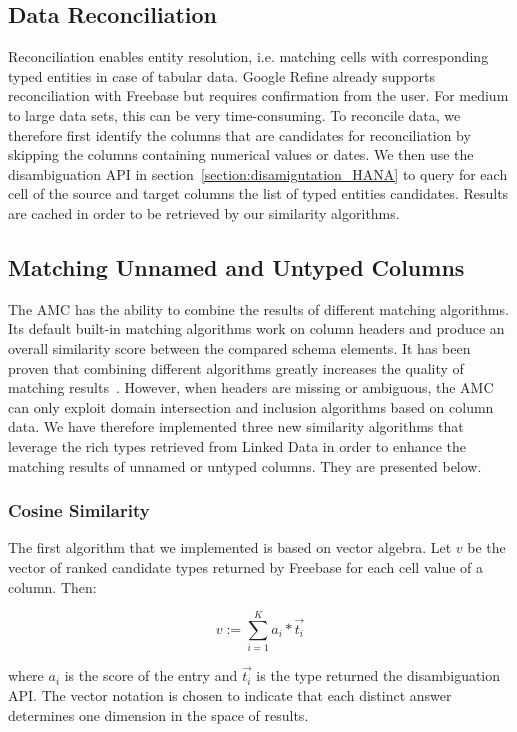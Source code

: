 \subsection{Data Reconciliation}
Reconciliation enables entity resolution, i.e. matching cells with corresponding typed entities in case of tabular data. Google Refine already supports reconciliation with Freebase but requires confirmation from the user. For medium to large data sets, this can be very time-consuming. To reconcile data, we therefore first identify the columns that are candidates for reconciliation by skipping the columns containing numerical values or dates. We then use the disambiguation API in section~\ref{section:disamigutation_HANA} to query for each cell of the source and target columns the list of typed entities candidates. Results are cached in order to be retrieved by our similarity algorithms.

\subsection{Matching Unnamed and Untyped Columns}

The AMC has the ability to combine the results of different matching algorithms. Its default built-in matching algorithms work on column headers and produce an overall similarity score between the compared schema elements. It has been proven that combining different algorithms greatly increases the quality of matching results~\cite{Peukert:ICDE:12}\cite{conf/wise/StracciaT05}. However, when headers are missing or ambiguous, the AMC can only exploit domain intersection and inclusion algorithms based on column data. We have therefore implemented three new similarity algorithms that leverage the rich types retrieved from Linked Data in order to enhance the matching results of unnamed or untyped columns. They are presented below.


\subsubsection{Cosine Similarity}
The first algorithm that we implemented is based on vector algebra. Let $v$ be the vector of ranked candidate types returned by Freebase for each cell value of a column. Then:

\begin{equation}\label{equation:equation_3}
v:=\sum^K_{i=1}{a_i}*\overrightarrow{t_i}
\end{equation}

where $a_i$ is the score of the entry and $\overrightarrow{t_i}$ is the type returned the disambiguation API. The vector notation is chosen to indicate that each distinct answer determines one dimension in the space of results.

